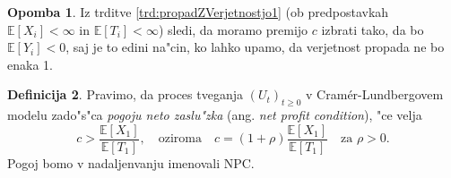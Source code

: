 \documentclass[12pt, a4paper, reqno]{amsart}
\theoremstyle{definition}
\newtheorem{definicija}{Definicija}[section]
\newtheorem{opomba}[definicija]{Opomba}
\theoremstyle{plain}
\newcommand{\N}{\mathbb{N}}
\newcommand{\E}{\mathbb{E}}
\newcommand{\Prob}{\mathbb{P}}
\newcommand{\1}{\mathds{1}}
\begin{document}
        \begin{opomba}
            Iz trditve \ref{trd:propadZVerjetnostjo1} (ob predpostavkah $\E\left[X_i\right] < \infty$
            in $\E\left[T_i\right] < \infty$) sledi, da moramo premijo $c$ izbrati tako, da bo 
            $\E\left[Y_i\right] < 0$, saj je to edini na"cin, ko lahko upamo, da verjetnost propada ne bo
            enaka 1.
            \label{op:izbiraPremije}
        \end{opomba}
    
%
%
%

        \begin{definicija}
            Pravimo, da proces tveganja $(U_t)_{t\geq0}$ v Cramér-Lundbergovem modelu
             zado"s"ca \textit{pogoju neto zaslu"zka} (ang. \textit{net profit condition}), "ce velja 
            \begin{equation*}
                c > \frac{\E\left[X_1\right]}{\E\left[T_1\right]}, \quad \text{oziroma} \quad 
                c = (1 + \rho)\frac{\E\left[X_1\right]}{\E\left[T_1\right]} \quad \text{za $\rho > 0$}.
            \end{equation*}
            Pogoj bomo v nadaljenvanju imenovali NPC.
            \label{def:NPC}
        \end{definicija}
\end{document}
